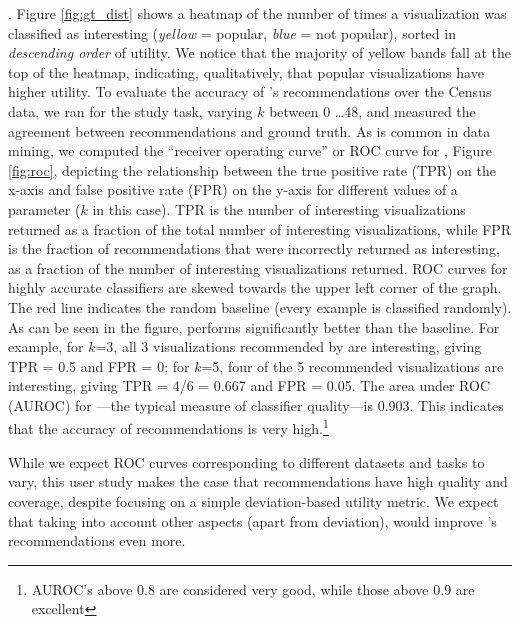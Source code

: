 .
Figure \ref{fig:gt_dist} shows a heatmap of the number of times a
visualization was classified as interesting 
({\em yellow} = popular, {\em blue} = not popular), sorted
in {\em descending order} of utility. 
We notice that the majority of yellow bands fall at the top of the
heatmap, indicating, qualitatively, that popular visualizations have higher utility.
To evaluate the accuracy of \SeeDB's recommendations over the Census data, 
we ran \SeeDB for the study task, varying $k$ between 0 \ldots 48, and measured
the agreement between \SeeDB recommendations and ground truth.
As is common in data mining, 
we computed the ``receiver operating curve'' or ROC curve for \SeeDB, 
Figure \ref{fig:roc}, depicting 
the relationship between the true positive rate (TPR) on the 
x-axis and false positive rate (FPR) on the y-axis for different values of a
parameter ($k$ in this case). 
TPR is the number of interesting visualizations returned as a fraction of the 
total number of interesting visualizations, 
while FPR is the fraction of recommendations
that were incorrectly returned as interesting, as a fraction of the number
of interesting visualizations returned. 
ROC curves for highly accurate classifiers are skewed towards the upper left
corner of the graph. The red line indicates the random baseline (every example
is classified randomly).
As can be seen in the figure, \SeeDB performs significantly better than the baseline.
For example, for $k$=3, all 3 visualizations recommended by \SeeDB are interesting,
giving TPR = 0.5 and FPR = 0; for $k$=5, 
four of the 5 recommended visualizations are interesting, 
giving TPR = 4/6 = 0.667 and FPR = 0.05. 
The area under ROC (AUROC) for \SeeDB---the typical measure of 
classifier quality---is 0.903.
This indicates that the accuracy of \SeeDB recommendations is very high.\footnote{\small AUROC's 
above 0.8 are considered very good, while those above 0.9 are
excellent}

While we expect ROC curves corresponding to different datasets and tasks to vary,
this user study makes the case that \SeeDB recommendations have high quality
and coverage,
despite focusing on a simple deviation-based utility metric.
We expect that taking into account other aspects (apart from deviation),
would improve \SeeDB's recommendations even more.

